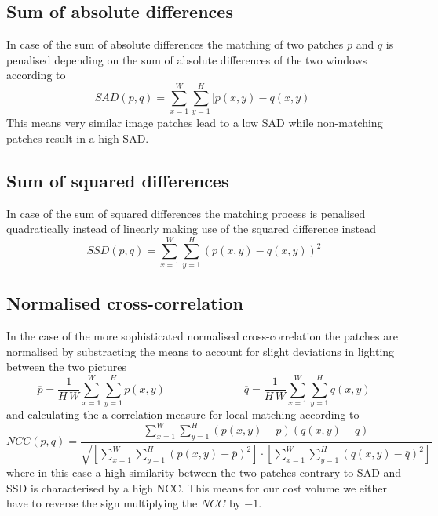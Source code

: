 \documentclass{article}
\begin{document}
\subsection{Sum of absolute differences}
In case of the sum of absolute differences the matching of two patches $p$ and $q$ is penalised depending on the sum of absolute differences of the two windows according to
\begin{equation}
SAD(p,q) = \sum\limits_{x=1}^W \sum\limits_{y=1}^H | p(x,y) - q(x,y) |
\end{equation}
This means very similar image patches lead to a low SAD while non-matching patches result in a high SAD.

\subsection{Sum of squared differences}
In case of the sum of squared differences the matching process is penalised quadratically instead of linearly making use of the squared difference instead
\begin{equation}
SSD(p,q) = \sum\limits_{x=1}^W \sum\limits_{y=1}^H ( p(x,y) - q(x,y) )^2
\end{equation}

\subsection{Normalised cross-correlation}
In the case of the more sophisticated normalised cross-correlation the patches are normalised by substracting the means to account for slight deviations in lighting between the two pictures
\begin{equation}
\overline{p} = \frac{1}{H \, W} \sum\limits_{x=1}^W \sum\limits_{y=1}^H p(x,y) \hspace{3cm} \overline{q} = \frac{1}{H \, W} \sum\limits_{x=1}^W \sum\limits_{y=1}^H q(x,y)
\end{equation}
and calculating the a correlation measure for local matching according to
\begin{equation}
NCC(p,q) = \frac{\sum\limits_{x=1}^W \sum\limits_{y=1}^H (p(x,y) - \overline{p}) (q(x,y) - \overline{q})}{\sqrt{\left[ \sum\limits_{x=1}^W \sum\limits_{y=1}^H (p(x,y) - \overline{p})^2 \right] \cdot \left[ \sum\limits_{x=1}^W \sum\limits_{y=1}^H (q(x,y) - \overline{q})^2 \right] }}
\end{equation}
where in this case a high similarity between the two patches contrary to SAD and SSD is characterised by a high NCC. This means for our cost volume we either have to reverse the sign multiplying the $NCC$ by $-1$.
\end{document}
